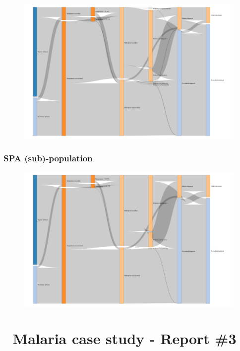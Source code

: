 \documentclass[
  letterpaper,
  DIV=11,
  numbers=noendperiod,
  oneside]{scrreprt}
\begin{document}
\begin{figure}

\includegraphics{malaria_case_study_02_report_files/figure-pdf/unnamed-chunk-12-1.pdf}

\end{figure}

\hypertarget{spa-sub-population}{%
\subsection{SPA (sub)-population}\label{spa-sub-population}}

\begin{figure}

\includegraphics{malaria_case_study_02_report_files/figure-pdf/unnamed-chunk-13-1.pdf}

\end{figure}

\hypertarget{malaria-case-study---report-3}{%
\chapter{\texorpdfstring{{📙} Malaria case study - Report
\#3}{📙 Malaria case study - Report \#3}}\label{malaria-case-study---report-3}}
\end{document}

